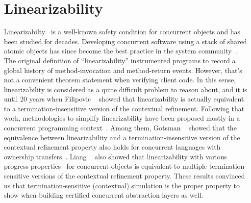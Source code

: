 \section{Linearizability}
\label{chatper:related:sec:linearizability}


Linearizabilty~\cite{herlihy90}  is a well-known safety condition for concurrent objects 
and has been studied for decades. 
Developing concurrent software using a stack of shared atomic objects has since
become the best practice in the system
community~\cite{Herlihy08book,ospp11}. 
The original definition of ``linearizability'' instrumented programs
to record a global history of method-invocation and method-return
events. However, that's not a convenient theorem statement when
verifying client code.
In this sense,
linearizability is considered as a quite 
difficult problem to reason about, and it is until 20 years when 
Filipovic \etal~\cite{filipovic10} showed that linearizability is actually equivalent
to a termination-insensitive version of the contextual refinement.
Following that work, methodologies to simplify linearizability have been
proposed mostly in a concurrent programming context~\cite{Elmas10tacas,
Liang13pldi,Gotsman12concur,Viktor10CAV}.
Among them, Gotsman \etal~\cite{Gotsman12concur} showed that the equivalence between linearizability and a termination-insensitive version of the contextual refinement property also
holds for concurrent languages with ownership transfers~\cite{ohearn:concur04}.  
Liang \etal~\cite{liang13,lili16} also showed that linearizability with various
progress properties~\cite{Herlihy08book} for concurrent objects is
equivalent to multiple termination-sensitive versions of the contextual refinement property. 
These results convinced us that 
termination-sensitive (contextual) simulation is the proper property to show
when building certified
concurrent abstraction layers as well.

